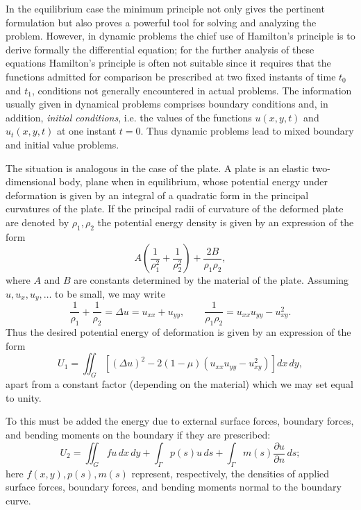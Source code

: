 In the equilibrium case the minimum principle not only gives the pertinent formulation but also proves a powerful tool for solving and analyzing the problem. However, in dynamic problems the chief use of Hamilton's principle is to derive formally the differential equation; for the further analysis of these equations Hamilton's principle is often not suitable since it requires that the functions admitted for comparison be prescribed at two fixed instants of time $t_0$ and $t_1$, conditions not generally encountered in actual problems. The information usually given in dynamical problems comprises boundary conditions and, in addition, \emph{initial conditions}, i.e. the values of the functions $u(x,y,t)$ and $u_t(x,y,t)$ at one instant $t=0$. Thus dynamic problems lead to mixed boundary and initial value problems.

The situation is analogous in the case of the plate. A plate is an elastic two-dimensional body, plane when in equilibrium, whose potential energy under deformation is given by an integral of a quadratic form in the principal curvatures of the plate. If the principal radii of curvature of the deformed plate are denoted by $\rho_1,\rho_2$ the potential energy density is given by an expression of the form
\[
A\left(\frac1{\rho_1^2}+\frac1{\rho_2^2}\right)+\frac{2B}{\rho_1\rho_2},
\]
where $A$ and $B$ are constants determined by the material of the plate. Assuming $u,u_x,u_y,\ldots$ to be small, we may write
\[
\frac1{\rho_1}+\frac1{\rho_2}=\Delta u=u_{xx}+u_{yy},\qquad
\frac1{\rho_1\rho_2}=u_{xx}u_{yy}-u_{xy}^2.
\]
Thus the desired potential energy of deformation is given by an expression of the form
\begin{equation}\tag{101}
U_1=\iint_G\left[(\Delta u)^2-2(1-\mu)(u_{xx}u_{yy}-u_{xy}^2)\right]dx\,dy,
\end{equation}
apart from a constant factor (depending on the material) which we may set equal to unity.

To this must be added the energy due to external surface forces, boundary forces, and bending moments on the boundary if they are prescribed:
\[
U_2=\iint_Gfu\,dx\,dy+\int_\Gamma p(s)u\,ds+\int_\Gamma m(s)\frac{\partial u}{\partial n}\,ds;
\]
here $f(x,y),p(s),m(s)$ represent, respectively, the densities of applied surface forces, boundary forces, and bending moments normal to the boundary curve.

